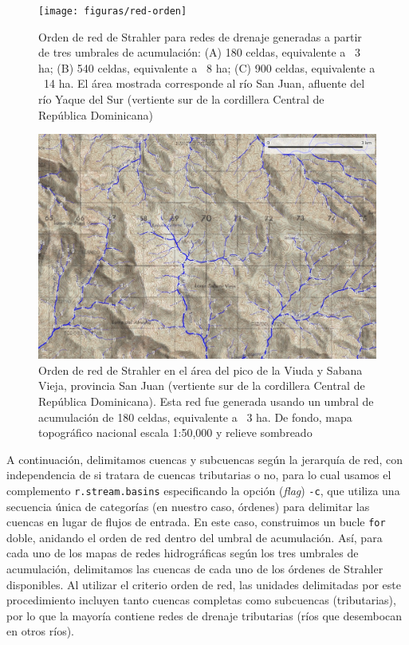 \documentclass[spanish]{article}
\begin{document}
\begin{figure}

{\centering \texttt{[image: figuras/red-orden]} 

}

\caption{Orden de red de Strahler para redes de drenaje generadas a partir de tres umbrales de acumulación: (A) 180 celdas, equivalente a ~3 ha; (B) 540 celdas, equivalente a ~8 ha; (C) 900 celdas, equivalente a ~14 ha. El área mostrada corresponde al río San Juan, afluente del río Yaque del Sur (vertiente sur de la cordillera Central de República Dominicana)}\label{fig:redorden3umbrales}
\end{figure}

\begin{figure}

{\centering \includegraphics[width=1\linewidth]{figuras/red-orden-detalle-mtn} 

}

\caption{Orden de red de Strahler en el área del pico de la Viuda y Sabana Vieja, provincia San Juan (vertiente sur de la cordillera Central de República Dominicana). Esta red fue generada usando un umbral de acumulación de 180 celdas, equivalente a ~3 ha. De fondo, mapa topográfico nacional escala 1:50,000 y relieve sombreado}\label{fig:redordenumbral180}
\end{figure}

A continuación, delimitamos cuencas y subcuencas según la jerarquía de
red, con independencia de si tratara de cuencas tributarias o no, para
lo cual usamos el complemento \texttt{r.stream.basins} especificando la
opción (\emph{flag}) \texttt{-c}, que utiliza una secuencia única de
categorías (en nuestro caso, órdenes) para delimitar las cuencas en
lugar de flujos de entrada. En este caso, construimos un bucle
\texttt{for} doble, anidando el orden de red dentro del umbral de
acumulación. Así, para cada uno de los mapas de redes hidrográficas
según los tres umbrales de acumulación, delimitamos las cuencas de cada
uno de los órdenes de Strahler disponibles. Al utilizar el criterio
orden de red, las unidades delimitadas por este procedimiento incluyen
tanto cuencas completas como subcuencas (tributarias), por lo que la
mayoría contiene redes de drenaje tributarias (ríos que desembocan en
otros ríos).
\end{document}
